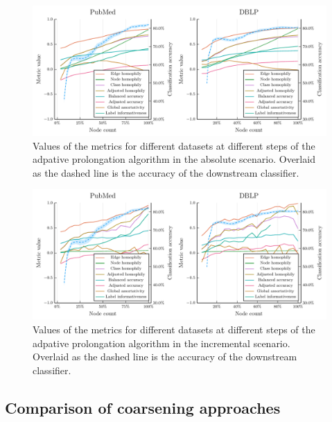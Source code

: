 \begin{figure}
  \centering
  \includegraphics[width = \linewidth]{images/metrics-absolute/metrics-absolute.pdf}
  \caption{Values of the metrics for different datasets at different steps of the adpative prolongation algorithm in the absolute scenario. Overlaid as the dashed line is the accuracy of the downstream classifier.}
  \label{fig:metrics-absolute}
\end{figure}

\begin{figure}
  \centering
  \includegraphics[width = \linewidth]{images/metrics-incremental/metrics-incremental.pdf}
  \caption{Values of the metrics for different datasets at different steps of the adpative prolongation algorithm in the incremental scenario. Overlaid as the dashed line is the accuracy of the downstream classifier.}
  \label{fig:metrics-incremental}
\end{figure}

\subsection{Comparison of coarsening approaches}

